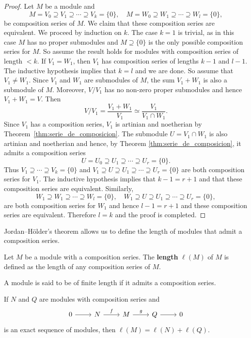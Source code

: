 \begin{proof}
    Let $M$ be a module and
    \[
		M=V_0\supseteq V_1\supseteq\cdots\supseteq V_k=\{0\},
		\quad
		M=W_0\supseteq W_1\supseteq\cdots\supseteq W_l=\{0\},
	\]
	be composition series of $M$. 
	We claim that these composition series are equivalent. 
	We proceed by induction on $k$. The case $k=1$ is trivial, as 
	in this case $M$ has no proper submodules and $M\supseteq\{0\}$ 
	is the only possible composition series for $M$. So
	assume the result holds for modules with composition series of length $<k$. If $V_1=W_1$, then 
	$V_1$ has composition series of lengths $k-1$ and $l-1$. The inductive hypothesis implies that 
	$k=l$ and we are done. So assume that $V_1\ne W_1$. Since $V_1$ and $W_1$ are submodules of $M$, the
	sum $V_1+W_1$ is also a submodule of $M$. Moreover, $V/V_1$ has no non-zero proper submodules
	and hence 
	$V_1+W_1=V$. Then 
	\[
		V/V_1=\frac{V_1+W_1}{V_1}\simeq\frac{V_1}{V_1\cap W_1}.
	\]
	Since $V_1$ has a composition series, $V_1$ is artinian and
	noetherian by Theorem~\ref{thm:serie_de_composicion}. The submodule $U=V_1\cap W_1$ is also 
	artinian and noetherian and hence, by Theorem \ref{thm:serie_de_composicion}, 
	it admits a composition series 
	\[
		U=U_0\supseteq U_1\supseteq\cdots\supseteq U_r=\{0\}.
	\]
    Thus
    $V_1\supseteq\cdots\supseteq V_k=\{0\}$ and  
	$V_1\supseteq U\supseteq U_1\supseteq\cdots\supseteq U_r=\{0\}$ are both composition 
	series for $V_1$. The inductive hypothesis implies that 
	$k-1=r+1$ and that these composition series are equivalent. Similarly, 
	\[
		W_1\supseteq W_1\supseteq\cdots\supseteq W_l=\{0\},
		\quad
		W_1\supseteq U\supseteq U_1\supseteq\cdots\supseteq U_{r}=\{0\},
	\]
    are both composition series for $W_1$ and hence $l-1=r+1$ and these composition 
    series are equivalent. Therefore $l=k$ and the proof is completed. 
\end{proof}

Jordan--H\"older's theorem allows us to define the 
length of modules that admit a composition series. 

\begin{definition}
    Let $M$ be a module with a composition series. 
    The \textbf{length} $\ell(M)$ of $M$ is defined as the length of any composition series of $M$. 
\end{definition}

A module is said to be of finite length if it admits a composition series. 

\begin{exercise}
	If $N$ and $Q$ are modules with composition series and  
	\[
	\begin{tikzcd}
		0 \arrow[r]
		& N \arrow{r}{f}
		& M \arrow{r}{g}
		& Q \arrow[r]
		& 0
	\end{tikzcd}
	\]
	is an exact sequence of modules, then $\ell(M)=\ell(N)+\ell(Q)$.
\end{exercise}

